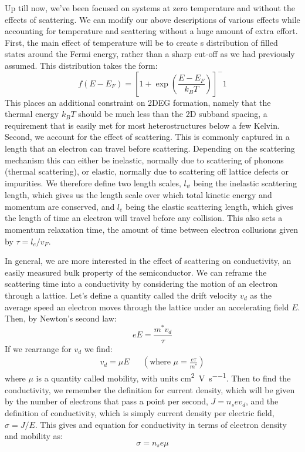 Up till now, we've been focused on systems at zero temperature and without the effects of scattering. We can modify our above
descriptions of various effects while accounting for temperature and scattering without a huge amount of extra effort.
First, the main effect of temperature will be to create s distribution of filled states around the Fermi energy, rather
than a sharp cut-off as we had previously assumed. This distribution takes the form:
\begin{equation}
  f(E - E_F) = \left[1 + \exp\left(\frac{E - E_F}{k_B T}\right)\right]^-1
\end{equation}
This places an additional constraint on 2DEG formation, namely that the thermal energy $k_B T$ should be much less than the
2D subband spacing, a requirement that is easily met for most heterostructures below a few Kelvin. Second, we account for the
effect of scattering. This is commonly captured in a length that an electron can travel before scattering. Depending on the scattering
mechanism this can either be inelastic, normally due to scattering of phonons (thermal scattering), or elastic, normally due to 
scattering off lattice defects or impurities. We therefore define two length scales, $l_\psi$ being the inelastic scattering length,
which gives us the length scale over which total kinetic energy and momentum are conserved, and $l_e$ being the elastic scattering
length, which gives the length of time an electron will travel before any collision. This also sets a momentum relaxation time, the
amount of time between electron collusions given by $\tau = l_e/v_F$.

In general, we are more interested in the effect of scattering on conductivity, an easily measured bulk property of
the semiconductor. We can reframe the scattering time into a conductivity by considering the motion of an electron
through a lattice. Let's define a quantity called the drift velocity $v_d$ as the average speed an electron moves through
the lattice under an accelerating field $E$. Then, by Newton's second law:
\begin{equation}
  eE = \frac{m^* v_d}{\tau}
\end{equation}
If we rearrange for $v_d$ we find:
\begin{align}
  v_d = \mu E && (\textrm{where~} \mu = \frac{e \tau}{m^*})
\end{align}
where $\mu$ is a quantity called mobility, with units \si{\square\centi\meter\per\volt\per\second}.
Then to find the conductivity, we remember the definition for current
density, which will be given by the number of electrons that pass a point per second, $J = n_s e v_d$, and the definition
of conductivity, which is simply current density per electric field, $\sigma = J/E$. This gives and equation for conductivity
in terms of electron density and mobility as:
\begin{equation}
  \sigma = n_s e \mu
\end{equation}

